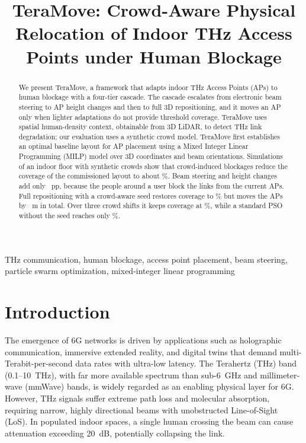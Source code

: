 \documentclass[conference]{IEEEtran}
\begin{document}
	\author{
		}

	\title{TeraMove: Crowd-Aware Physical Relocation of Indoor THz Access Points under Human Blockage}

	\maketitle

	\begin{abstract}
		We present TeraMove, a framework that adapts indoor THz Access Points (APs) to human blockage with a four-tier cascade. The cascade escalates from electronic beam steering to AP height changes and then to full 3D repositioning, and it moves an AP only when lighter adaptations do not provide threshold coverage. TeraMove
		uses spatial human-density context, obtainable from 3D LiDAR, to detect THz link degradation; our evaluation uses a synthetic crowd model.
		TeraMove first establishes an optimal baseline layout for AP placement using a Mixed Integer Linear Programming (MILP) model over 3D
		coordinates and beam orientations.
		Simulations of an indoor floor with synthetic crowds show that crowd-induced
		blockages reduce the coverage of the commissioned layout to about \TierBase\%. Beam steering and height changes add only \TierGainTwoThree~pp, because the people around a user block the links from the current APs. Full repositioning with a crowd-aware seed restores coverage to \TierFour\% but moves the APs by \TierDispFour~m in total. Over three crowd shifts it keeps coverage at \SeqTmCovAvg\%, while a standard PSO without the seed reaches only \SeqPsoCovAvg\%.
	\end{abstract}

	\begin{IEEEkeywords}
		THz communication, human blockage, access point placement, beam steering, particle swarm optimization, mixed-integer linear programming
	\end{IEEEkeywords}

	\section{Introduction}

	The emergence of 6G networks is driven by applications such as holographic communication, immersive extended reality, and digital twins that demand multi-Terabit-per-second data rates with ultra-low latency. The Terahertz (THz) band (0.1--10~THz), with far more available spectrum than sub-6~GHz and millimeter-wave (mmWave) bands, is widely regarded as an enabling physical layer for 6G. However, THz signals suffer extreme path loss and molecular absorption, requiring narrow, highly directional beams with unobstructed Line-of-Sight (LoS). In populated indoor spaces, a single human crossing the beam can cause attenuation exceeding 20~dB, potentially collapsing the link.
\end{document}

